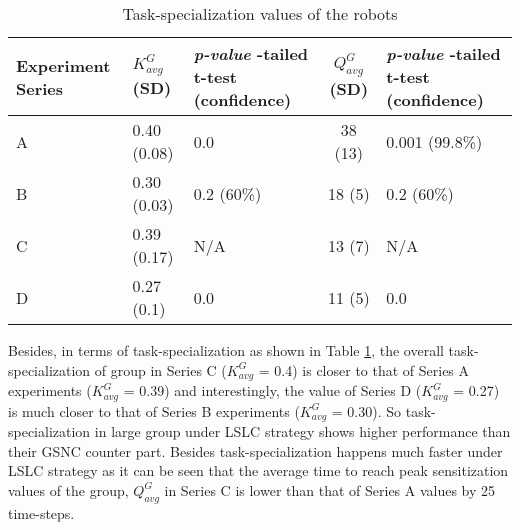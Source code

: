 \begin{table}
\begin{center}
\caption{\small Task-specialization values of the robots}
\begin{tabular}{|p{0.7in}|p{0.7in}|m{0.7in}|c|m{0.7in}|}
\hline Experiment \protect\newline Series & $ K^G_{avg}$ (SD) & \textit{ p-value} \protect\newline 1-tailed t-test (confidence)  & $ Q^G_{avg}$ (SD) & \textit{ p-value} \protect\newline 1-tailed t-test \protect\newline (confidence) \\ 
\hline A & 0.40 (0.08)& 0.0 & 38 (13) & 0.001 (99.8\%)\\ 
\hline B &  0.30 (0.03) & 0.2 (60\%) &  18 (5) & 0.2 (60\%)\\
\hline C  & 0.39 (0.17) & N/A & 13 (7) & N/A \\
\hline D  & 0.27 (0.1)& 0.0 & 11 (5) & 0.0\\
\hline
\end{tabular}
\label{table:k-cmp} 
\end{center}
\end{table}
Besides, in terms of task-specialization as shown in Table \ref{table:k-cmp}, the overall task-specialization of group in Series C ($K^G_{avg}$ = 0.4) is  closer to that of Series A experiments ($K^G_{avg}$ = 0.39) and interestingly, the value of  Series D ($K^G_{avg}$ = 0.27) is  much closer to that of Series B experiments ($K^G_{avg}$ = 0.30). So task-specialization in large group under LSLC strategy shows higher performance than their GSNC counter part. Besides task-specialization happens much faster under LSLC strategy as it can be seen that the average time to reach peak sensitization values  of the group,  $Q^G_{avg}$ in Series C is lower than that of Series A values by 25 time-steps.

